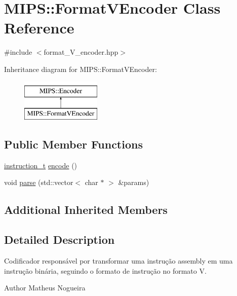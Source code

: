 \hypertarget{classMIPS_1_1FormatVEncoder}{}\section{M\+I\+PS\+:\+:Format\+V\+Encoder Class Reference}
\label{classMIPS_1_1FormatVEncoder}


{\ttfamily \#include $<$format\+\_\+\+V\+\_\+encoder.\+hpp$>$}

Inheritance diagram for M\+I\+PS\+:\+:Format\+V\+Encoder\+:\begin{figure}[H]
\begin{center}
\leavevmode
\includegraphics[height=2.000000cm]{classMIPS_1_1FormatVEncoder}
\end{center}
\end{figure}
\subsection*{Public Member Functions}
\begin{DoxyCompactItemize}
\item 
\hyperlink{core_8hpp_aa514fd240a0e29abb2a2e4c805d7f1a4}{instruction\+\_\+t} \hyperlink{classMIPS_1_1FormatVEncoder_a95e96820cef484d427c64145006d8837}{encode} ()
\item 
void \hyperlink{classMIPS_1_1FormatVEncoder_af73c15fbc94eac0f8b28e6d7fa2e4dc2}{parse} (std\+::vector$<$ char $\ast$ $>$ \&params)
\end{DoxyCompactItemize}
\subsection*{Additional Inherited Members}


\subsection{Detailed Description}
Codificador responsável por transformar uma instrução assembly em uma instrução binária, seguindo o formato de instrução no formato V.

\begin{DoxyAuthor}{Author}
Matheus Nogueira 
\end{DoxyAuthor}



